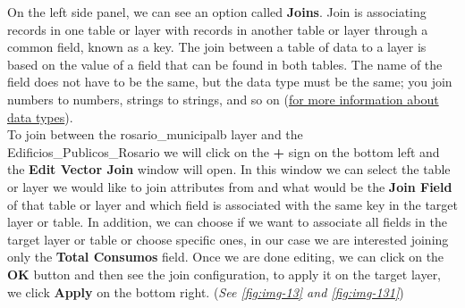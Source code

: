 \documentclass[
]{book}
\begin{document}
On the left side panel, we can see an option called \textbf{Joins}. Join is associating records in one table or layer with records in another table or layer through a common field, known as a key. The join between a table of data to a layer is based on the value of a field that can be found in both tables. The name of the field does not have to be the same, but the data type must be the same; you join numbers to numbers, strings to strings, and so on (\href{https://dataled.academy/guides/data-types/}{for more information about data types}).\\
To join between the {rosario\_municipalb} layer and the {Edificios\_Publicos\_Rosario} we will click on the \textbf{+} sign on the bottom left and the \textbf{Edit Vector Join} window will open. In this window we can select the table or layer we would like to join attributes from and what would be the \textbf{Join Field} of that table or layer and which field is associated with the same key in the target layer or table. In addition, we can choose if we want to associate all fields in the target layer or table or choose specific ones, in our case we are interested joining only the \textbf{Total Consumos} field.
Once we are done editing, we can click on the \textbf{OK} button and then see the join configuration, to apply it on the target layer, we click \textbf{Apply} on the bottom right. (\emph{See \ref{fig:img-13} and \ref{fig:img-131}})
\end{document}
